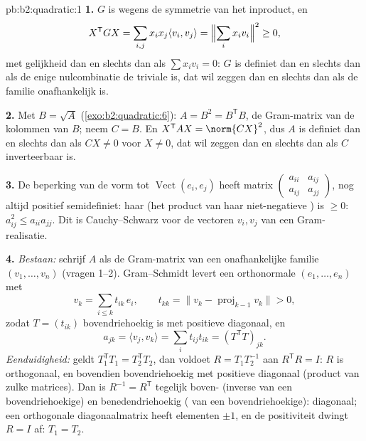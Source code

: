 \begin{solution}{pb:b2:quadratic:1}
\textbf{1.} $G$ is  wegens de symmetrie van het
inproduct, en
\[
X^{\mathsf T}GX = \sum_{i,j}x_ix_j\langle v_i, v_j\rangle
= \Bigl\|\sum_i x_iv_i\Bigr\|^2 \geq 0 ,
\]
met gelijkheid dan en slechts dan als $\sum x_iv_i = 0$: $G$ is
definiet dan en slechts dan als de enige nulcombinatie de triviale
is, dat wil zeggen dan en slechts dan als de familie onafhankelijk
is.

\textbf{2.} Met $B = \sqrt A$ (\cref{exo:b2:quadratic:6}): $A
= B^2 = B^{\mathsf T}B$, de Gram-matrix van de kolommen van $B$;
neem $C = B$. En $X^{\mathsf T}AX = \norm{CX}^2$, dus $A$ is
definiet dan en slechts dan als $CX \neq 0$ voor $X \neq 0$, dat
wil zeggen dan en slechts dan als $C$ inverteerbaar is.

\textbf{3.} De beperking van de vorm tot
$\operatorname{Vect}(e_i, e_j)$ heeft matrix
$\begin{pmatrix} a_{ii} & a_{ij}\\ a_{ij} & a_{jj}
\end{pmatrix}$, nog altijd positief semidefiniet: haar 
(het product van haar niet-negatieve ) is $\geq 0$:
$a_{ij}^2 \leq a_{ii}a_{jj}$. Dit is Cauchy--Schwarz voor de
vectoren $v_i, v_j$ van een Gram-realisatie.

\textbf{4.} \emph{Bestaan:} schrijf $A$ als de Gram-matrix van een
onafhankelijke familie $(v_1, \dots, v_n)$ (vragen 1--2).
Gram--Schmidt levert een orthonormale $(e_1, \dots, e_n)$ met
\[
v_k = \sum_{i \leq k} t_{ik}\,e_i,
\qquad t_{kk} = \bigl\| v_k - \operatorname{proj}_{k-1}v_k
\bigr\| > 0 ,
\]
zodat $T = (t_{ik})$ bovendriehoekig is met positieve diagonaal, en
\[
a_{jk} = \langle v_j, v_k\rangle
= \sum_i t_{ij}t_{ik} = (T^{\mathsf T}T)_{jk} .
\]
\emph{Eenduidigheid:} geldt $T_1^{\mathsf T}T_1 = T_2^{\mathsf
T}T_2$, dan voldoet $R = T_1T_2^{-1}$ aan $R^{\mathsf T}R = I$: $R$
is orthogonaal, en bovendien bovendriehoekig met positieve
diagonaal (product van zulke matrices). Dan is $R^{-1} = R^{\mathsf
T}$ tegelijk boven- (inverse van een bovendriehoekige) en
benedendriehoekig ( van een bovendriehoekige):
diagonaal; een orthogonale diagonaalmatrix heeft elementen $\pm1$,
en de positiviteit dwingt $R = I$ af: $T_1 = T_2$.


\end{solution}

